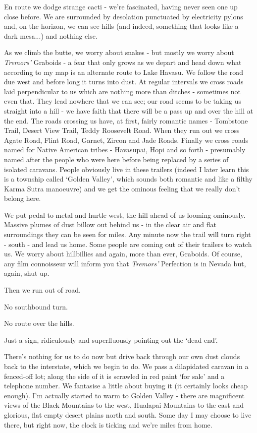 \documentclass[a5paper,10pt,titlepage,draft]{book}
\begin{document}
En route we dodge strange cacti - we're fascinated, having never seen one up close before.  We are surrounded by desolation punctuated by electricity pylons and, on the horizon, we can see hills (and indeed, something that looks like a dark mesa...) and nothing else.

As we climb the butte, we worry about snakes - but mostly we worry about \emph{Tremors'} Graboids - a fear that only grows as we depart and head down what according to my map is an alternate route to Lake Havasu.  We follow the road due west and before long it turns into dust.  At regular intervals we cross roads laid perpendicular to us which are nothing more than ditches - sometimes not even that.  They lead nowhere that we can see; our road seems to be taking us straight into a hill - we have faith that there will be a pass up and over the hill at the end.  The roads crossing us have, at first, fairly romantic names - Tombstone Trail, Desert View Trail, Teddy Roosevelt Road.  When they run out we cross Agate Road, Flint Road, Garnet, Zircon and Jade Roads.  Finally we cross roads named for Native American tribes - Havasupai, Hopi and so forth - presumably named after the people who were here before being replaced by a series of isolated caravans.  People obviously live in these trailers (indeed I later learn this is a township called `Golden Valley', which sounds both romantic and like a filthy Karma Sutra manoeuvre) and we get the ominous feeling that we really don't belong here.

We put pedal to metal and hurtle west, the hill ahead of us looming ominously.  Massive plumes of dust billow out behind us - in the clear air and flat surroundings they can be seen for miles.  Any minute now the trail will turn right - south - and lead us home.  Some people are coming out of their trailers to watch us.  We worry about hillbillies and again, more than ever, Graboids.  Of course, any film connoisseur will inform you that \emph{Tremors'} Perfection is in Nevada but, again, shut up.

Then we run out of road.

No southbound turn.

No route over the hills.

Just a sign, ridiculously and superfluously pointing out the `dead end'.

There's nothing for us to do now but drive back through our own dust clouds back to the interstate, which we begin to do.  We pass a dilapidated caravan in a fenced-off lot; along the side of it is scrawled in red paint `for sale' and a telephone number.  We fantasise a little about buying it (it certainly looks cheap enough).  I'm actually started to warm to Golden Valley - there are magnificent views of the Black Mountains to the west, Hualapai Mountains to the east and glorious, flat empty desert plains north and south.  Some day I may choose to live there, but right now, the clock is ticking and we're miles from home.
\end{document}
